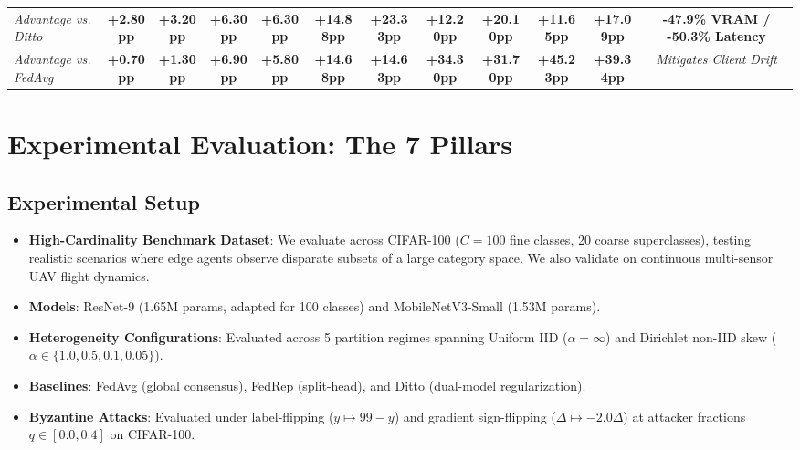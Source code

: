 \documentclass[sigconf]{acmart}
\begin{document}
\begin{table}[t]
{\begin{tabular}{lccccccccccc}
\midrule
\textit{Advantage vs. Ditto} & \textbf{+2.80pp} & \textbf{+3.20pp} & \textbf{+6.30pp} & \textbf{+6.30pp} & \textbf{+14.88pp} & \textbf{+23.33pp} & \textbf{+12.20pp} & \textbf{+20.10pp} & \textbf{+11.65pp} & \textbf{+17.09pp} & \textbf{-47.9\% VRAM / -50.3\% Latency} \\
\textit{Advantage vs. FedAvg} & \textbf{+0.70pp} & \textbf{+1.30pp} & \textbf{+6.90pp} & \textbf{+5.80pp} & \textbf{+14.68pp} & \textbf{+14.63pp} & \textbf{+34.30pp} & \textbf{+31.70pp} & \textbf{+45.23pp} & \textbf{+39.34pp} & \textit{Mitigates Client Drift} \\
\bottomrule
\end{tabular}
}
\end{table}

\section{Experimental Evaluation: The 7 Pillars}

\subsection{Experimental Setup}
\begin{itemize}
    \item \textbf{High-Cardinality Benchmark Dataset}: We evaluate across CIFAR-100 \cite{krizhevsky2009learning} ($C=100$ fine classes, 20 coarse superclasses), testing realistic scenarios where edge agents observe disparate subsets of a large category space. We also validate on continuous multi-sensor UAV flight dynamics.
    \item \textbf{Models}: ResNet-9 (1.65M params, adapted for 100 classes) and MobileNetV3-Small \cite{howard2019searching} (1.53M params).
    \item \textbf{Heterogeneity Configurations}: Evaluated across 5 partition regimes spanning Uniform IID ($\alpha=\infty$) and Dirichlet non-IID skew ($\alpha \in \{1.0, 0.5, 0.1, 0.05\}$).
    \item \textbf{Baselines}: FedAvg (global consensus), FedRep (split-head), and Ditto (dual-model regularization).
    \item \textbf{Byzantine Attacks}: Evaluated under label-flipping ($y \mapsto 99 - y$) and gradient sign-flipping ($\Delta \mapsto -2.0 \Delta$) at attacker fractions $q \in [0.0, 0.4]$ on CIFAR-100.
\end{itemize}
\end{document}
